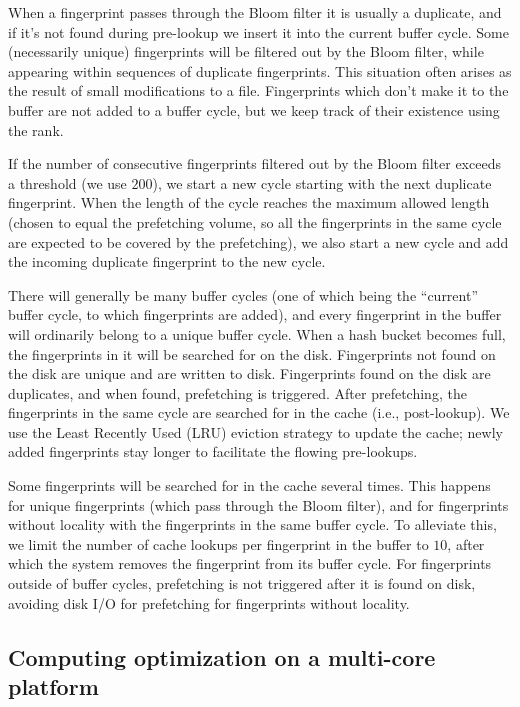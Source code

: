 \documentclass[prodmode,acmtecs]{acmsmall}
\begin{document}
When a fingerprint passes through the Bloom filter it is usually a duplicate, and if it's not found during pre-lookup we insert it into the current buffer cycle.  Some (necessarily unique) fingerprints will be filtered out by the Bloom filter, while appearing within sequences of duplicate fingerprints.  This situation often arises as the result of small modifications to a file.  Fingerprints which don't make it to the buffer are not added to a buffer cycle, but we keep track of their existence using the rank.

If the number of consecutive fingerprints filtered out by the Bloom filter exceeds a threshold (we use $200$), we start a new cycle starting with the next duplicate fingerprint.  When the length of the cycle reaches the maximum allowed length (chosen to equal the prefetching volume, so all the fingerprints in the same cycle are expected to be covered by the prefetching), we also start a new cycle and add the incoming duplicate fingerprint to the new cycle.

There will generally be many buffer cycles (one of which being the ``current'' buffer cycle, to which fingerprints are added), and every fingerprint in the buffer will ordinarily belong to a unique buffer cycle. When a hash bucket becomes full, the fingerprints in it will be searched for on the disk. Fingerprints not found on the disk are unique and are written to disk. Fingerprints found on the disk are duplicates, and when found, prefetching is triggered. After prefetching, the fingerprints in the same cycle are searched for in the cache (i.e., post-lookup). We use the Least Recently Used (LRU) eviction strategy to update the cache; newly added fingerprints stay longer to facilitate the flowing pre-lookups.

Some fingerprints will be searched for in the cache several times.  This happens for unique fingerprints (which pass through the Bloom filter), and for fingerprints without locality with the fingerprints in the same buffer cycle. To alleviate this, we limit the number of cache lookups per fingerprint in the buffer to $10$, after which the system removes the fingerprint from its buffer cycle. For fingerprints outside of buffer cycles, prefetching is not triggered after it is found on disk, avoiding disk I/O for prefetching for fingerprints without locality.


\subsection{Computing optimization on a multi-core platform}
\end{document}
